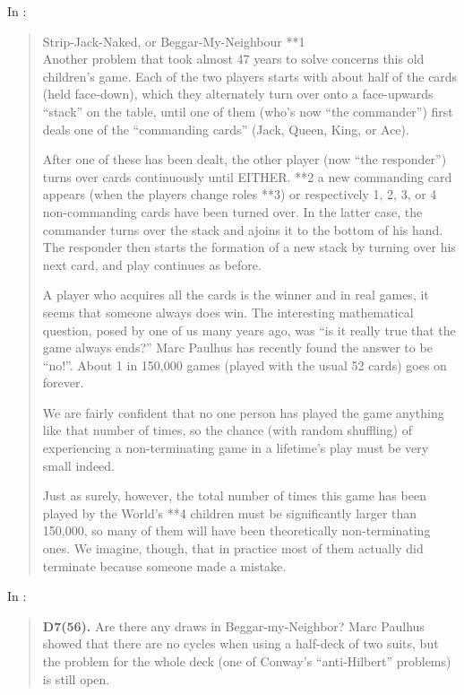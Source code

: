 \documentclass[a4paper,12pt]{article}
\begin{document}
In \cite[p.892]{winning_ways_2004}:
\begin{quotation}
Strip-Jack-Naked, or Beggar-My-Neighbour **1\\

Another problem that took almost 47 years to solve concerns this old 
children’s game. Each of the two players starts with about half of the cards 
(held face-down), which they alternately turn over onto a face-upwards “stack” 
on the table, until one of them (who's now “the commander”) first deals one of 
the “commanding cards” (Jack, Queen, King, or Ace).

After one of these has been dealt, the other player (now “the responder”) turns 
over cards continuously until EITHER. **2 a new commanding card appears (when 
the players change roles **3) or respectively 1, 2, 3, or 4 non-commanding cards 
have been turned over. In the latter case, the commander turns over the stack 
and ajoins it to the bottom of his hand. The responder then starts the formation 
of a new stack by turning over his next card, and play continues as before.

A player who acquires all the cards is the winner and in real games, it seems 
that someone always does win. The interesting mathematical question, posed by 
one of us many years ago, was “is it really true that the game always ends?” 
Marc Paulhus has recently found the answer to be “no!”. About 1 in 150,000 games 
(played with the usual 52 cards) goes on forever.

We are fairly confident that no one person has played the game anything like 
that number of times, so the chance (with random shuffling) of experiencing a 
non-terminating game in a lifetime’s play must be very small indeed.

Just as surely, however, the total number of times this game has been played by 
the World’s **4 children must be significantly larger than 150,000, so many of 
them will have been theoretically non-terminating ones. We imagine, though, that 
in practice most of them actually did terminate because someone made a mistake.
\end{quotation}

In \cite[p.483]{albert2009games}:%
\begin{quotation}
\textbf{D7(56).} Are there any draws in Beggar-my-Neighbor? Marc Paulhus
showed that there are no cycles when using a half-deck of two suits, but the 
problem for the whole deck (one of Conway’s “anti-Hilbert” problems) is still 
open.
\end{quotation}
\end{document}
